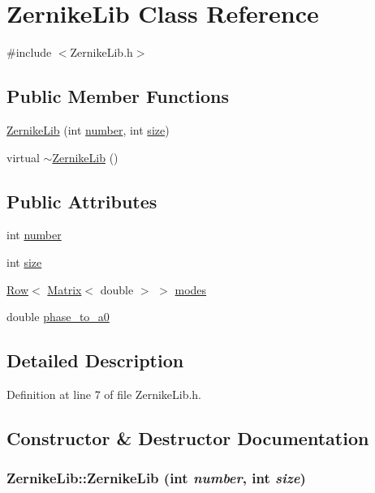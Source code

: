 \hypertarget{classZernikeLib}{
\section{ZernikeLib Class Reference}
\label{classZernikeLib}
}


{\ttfamily \#include $<$ZernikeLib.h$>$}

\subsection*{Public Member Functions}
\begin{DoxyCompactItemize}
\item 
\hyperlink{classZernikeLib_a55a55a2912127f2f21cb792cf4ab2539}{ZernikeLib} (int \hyperlink{classZernikeLib_a05ecfd0dd15af2caaedc23890a36866b}{number}, int \hyperlink{classZernikeLib_aec67cc4b8888597848f0ef75a4d28adb}{size})
\item 
virtual \hyperlink{classZernikeLib_a9e8decc57d7779a36b8c17951a9ef76c}{$\sim$ZernikeLib} ()
\end{DoxyCompactItemize}
\subsection*{Public Attributes}
\begin{DoxyCompactItemize}
\item 
int \hyperlink{classZernikeLib_a05ecfd0dd15af2caaedc23890a36866b}{number}
\item 
int \hyperlink{classZernikeLib_aec67cc4b8888597848f0ef75a4d28adb}{size}
\item 
\hyperlink{classRow}{Row}$<$ \hyperlink{classMatrix}{Matrix}$<$ double $>$ $>$ \hyperlink{classZernikeLib_ab42df70f2119b588e6b8b0594c48d4b3}{modes}
\item 
double \hyperlink{classZernikeLib_ad7f24ebdbe6f873e4c0fa01b5a51e578}{phase\_\-to\_\-a0}
\end{DoxyCompactItemize}


\subsection{Detailed Description}


Definition at line 7 of file ZernikeLib.h.



\subsection{Constructor \& Destructor Documentation}
\hypertarget{classZernikeLib_a55a55a2912127f2f21cb792cf4ab2539}{
\subsubsection[{ZernikeLib}]{\setlength{\rightskip}{0pt plus 5cm}ZernikeLib::ZernikeLib (int {\em number}, \/  int {\em size})}}
\label{classZernikeLib_a55a55a2912127f2f21cb792cf4ab2539}


